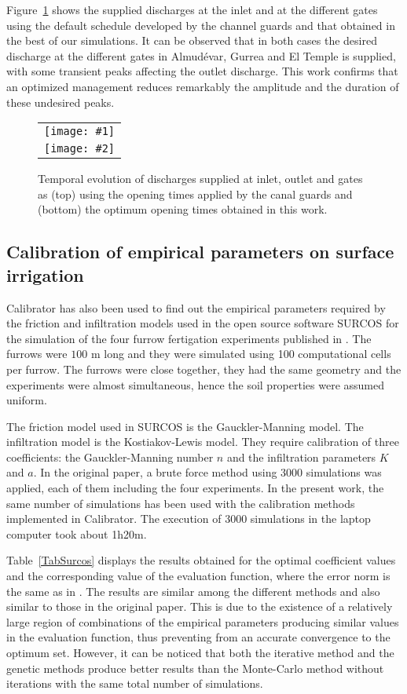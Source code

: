 \documentclass[review,authoryear]{elsarticle}
\newcommand{\FIGII}[4]
{
	\begin{figure}[ht!]
		\centering
		\begin{tabular}{c}
			\texttt{[image: \#1]} \\ \texttt{[image: \#2]}
		\end{tabular}
		\caption{#3.\label{#4}}
	\end{figure}
}
\begin{document}
Figure~\ref{FigSwigs} shows the supplied discharges at the inlet and at the different
gates using the default schedule developed by the channel guards and that 
obtained in the best of our simulations. It can be observed that in both cases 
the desired discharge at the different gates in Almudévar, Gurrea and El Temple is supplied,
with some transient peaks affecting the outlet discharge.
This work confirms that an optimized management reduces remarkably the amplitude and the duration of these undesired peaks.

\FIGII{Violada-contributions.eps}{Violada-optimized-contributions.eps}
{Temporal evolution of discharges supplied at inlet, outlet and gates as (top)
using the opening times applied by the canal guards and (bottom) the optimum
opening times obtained in this work}{FigSwigs}

\subsection{Calibration of empirical parameters on surface irrigation}

Calibrator has also been used to find out the empirical parameters required by the friction and infiltration
models used in the open source software SURCOS \citep{Surcos,SurcosGit,JaviSurcos3} for the simulation of the four furrow fertigation experiments published in \citet{JaviSurcos2}. The furrows were $100$ m long and they were simulated using 100 computational cells per furrow. The furrows were close together, they had the same geometry and the experiments were almost simultaneous, hence the soil properties were assumed uniform. 

The friction model used in SURCOS is the Gauckler-Manning model. The infiltration model is the Kostiakov-Lewis model. They require calibration of three coefficients: the Gauckler-Manning number $n$ and the infiltration parameters $K$ and $a$. In the original paper, a brute force method using 3000 simulations was applied, each of them including the four experiments. In the present work, the same number of simulations has been used with the calibration methods implemented in Calibrator. The execution of 3000 simulations in the laptop computer took about 1h20m.  

Table~\ref{TabSurcos} displays the results obtained for the optimal coefficient values and the corresponding
value of the evaluation function, where the error norm is the same as in \citet{JaviSurcos2}. The results are similar among the different methods and also similar to those in the original paper. This is due to the existence of a relatively large region of combinations of the empirical parameters producing similar values in the evaluation function, thus preventing from an accurate convergence to the optimum set. However, it can be noticed that both the iterative method and the genetic methods produce better results than the Monte-Carlo method without iterations with the same total number of simulations.
\end{document}
